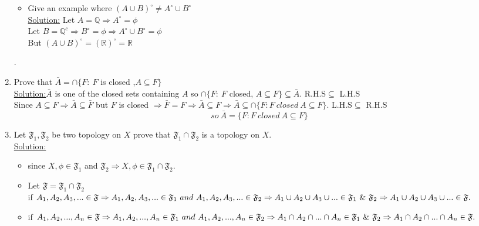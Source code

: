 \documentclass[fleqn,a4paper,12pt,towside]{article}
\begin{document}
\begin{enumerate}
\begin{itemize}
         \item Give an example where $(A\cup B)^\circ\neq A^\circ \cup B^\circ $\\
             {\color{red}\underline{Solution:}} Let $A=\mathbb{Q}\Rightarrow A^\circ=\phi$\\
             Let $B=\mathbb{Q}^c\Rightarrow B^\circ=\phi\Rightarrow A^\circ\cup B^\circ=\phi$\\
             But $(A\cup B)^\circ=(\mathbb{R})^\circ=\mathbb{R}$\\
            \noindent{\color{red}\rule{\linewidth}{.15mm}}
     \end{itemize}.
     \item Prove that $\bar{A}=\cap\{F:~F$ is closed ,$A\subseteq F\}$\\
    {\color{red}\underline{Solution:}}$\bar{A}$ is one of the closed sets containing $A$ so $\cap\{F:~F$ closed, $A\subseteq F\}\subseteq\bar{A}$. {\color{red}R.H.S$\subseteq$ L.H.S}\\
    Since $A\subseteq F\Rightarrow\bar{A}\subseteq\bar{F}$ but $F$ is closed $\Rightarrow \bar{F}=F\Rightarrow\bar{A}\subseteq F\Rightarrow \bar{A}\subseteq\cap\{F:F~closed~A\subseteq F\}$. {\color{red}L.H.S$\subseteq$ R.H.S}
    $$so~\bar{A}=\{F:F~closed~A\subseteq F\}$$
    \noindent{\color{red}\rule{\linewidth}{.3mm}}
     \item Let $\mathfrak{F}_1,\mathfrak{F}_2$ be two topology on $X$ prove that $\mathfrak{F}_1\cap \mathfrak{F}_2$ is a topology on $X$.\\
    {\color{red}\underline{Solution:}}
    \begin{itemize}
        \item since $X,\phi\in\mathfrak{F}_1$ and $\mathfrak{F}_2\Rightarrow X,\phi\in \mathfrak{F}_1\cap\mathfrak{F}_2.$
        \item Let $\mathfrak{F}=\mathfrak{F}_1\cap\mathfrak{F}_2$\\ 
        if $A_1,A_2,A_3,...\in\mathfrak{F}\Rightarrow A_1,A_2,A_3,...\in\mathfrak{F}_1~and~A_1,A_2,A_3,...\in\mathfrak{F}_2\\ 
        \Rightarrow A_1\cup A_2\cup A_3\cup... \in\mathfrak{F}_1~\&~\mathfrak{F}_2\Rightarrow A_1\cup A_2\cup A_3\cup...\in\mathfrak{F}.$ 
        \item if $A_1,A_2,...,A_n\in\mathfrak{F}\Rightarrow A_1,A_2,...,A_n\in\mathfrak{F}_1~and~A_1,A_2,...,A_n\in\mathfrak{F}_2\\ 
        \Rightarrow A_1\cap A_2\cap...\cap A_n \in\mathfrak{F}_1~\&~\mathfrak{F}_2\Rightarrow A_1\cap A_2\cap ...\cap A_n\in\mathfrak{F}.$ 
        \end{itemize}
\end{enumerate}
\end{document}
